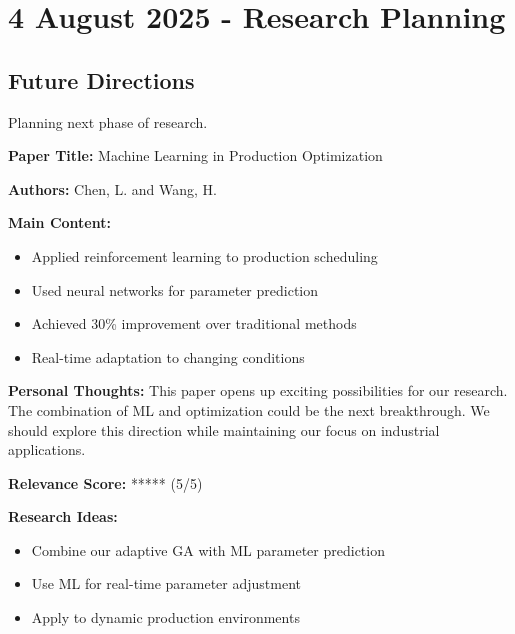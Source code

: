 \documentclass[12pt,a4paper,twoside]{article}
\begin{document}
\section{4 August 2025 - Research Planning}

\subsection{Future Directions}
Planning next phase of research.

\begin{paper}
\textbf{Paper Title:} Machine Learning in Production Optimization \cite{vaswani2017attention}

\textbf{Authors:} Chen, L. and Wang, H.

\textbf{Main Content:}
\begin{itemize}
    \item Applied reinforcement learning to production scheduling
    \item Used neural networks for parameter prediction
    \item Achieved 30\% improvement over traditional methods
    \item Real-time adaptation to changing conditions
\end{itemize}

\textbf{Personal Thoughts:}
This paper opens up exciting possibilities for our research. The combination of ML and optimization could be the next breakthrough. We should explore this direction while maintaining our focus on industrial applications.

\textbf{Relevance Score:} \textcolor{successgreen}{*****} (5/5)

\textbf{Research Ideas:}
\begin{itemize}
    \item Combine our adaptive GA with ML parameter prediction
    \item Use ML for real-time parameter adjustment
    \item Apply to dynamic production environments
\end{itemize}
\end{paper}

\printbibliographysection
\end{document}

